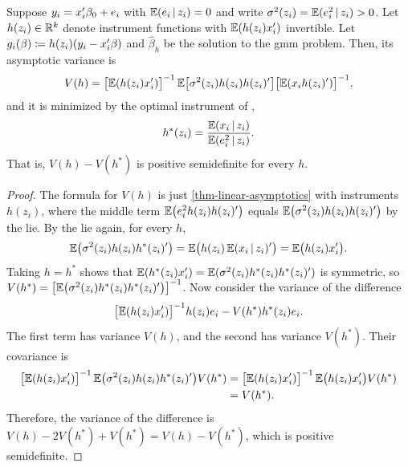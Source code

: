 \documentclass[a4paper,12pt]{article}
\begin{document}
\begin{theorem}\label{thm-optimal-instrument}
	Suppose $y_i=x_i^{\prime}\beta_0+e_i$ with $\operatorname{\mathbb{E}}(e_i\mathpunct{}|\mathpunct{} z_i)=0$ and write $\sigma^2(z_i)=\operatorname{\mathbb{E}}(e_i^2\mathpunct{}|\mathpunct{} z_i)>0$.
	Let $h(z_i)\in\mathbb{R}^k$ denote instrument functions with $\operatorname{\mathbb{E}}(h(z_i)x_i^{\prime})$ invertible.
	Let $g_i(\beta)\coloneqq h(z_i)(y_i-x_i^{\prime}\beta)$ and $\widehat\beta_h$ be the solution to the \gls{gmm} problem.
	Then, its asymptotic variance is
	\begin{align}
		V(h)=\bigl[\operatorname{\mathbb{E}}(h(z_i)x_i^{\prime})\bigr]^{-1}\operatorname{\mathbb{E}}\bigl[\sigma^2(z_i)h(z_i)h(z_i)^{\prime}\bigr]\bigl[\operatorname{\mathbb{E}}(x_ih(z_i)^{\prime})\bigr]^{-1},
	\end{align}
	and it is minimized by the optimal instrument of \textcite{chamberlain-1987},
	\begin{align}
		h^*(z_i)=\frac{\operatorname{\mathbb{E}}(x_i\mathpunct{}|\mathpunct{} z_i)}{\operatorname{\mathbb{E}}(e_i^2\mathpunct{}|\mathpunct{} z_i)}.
	\end{align}
	That is, $V(h)-V(h^*)$ is positive semidefinite for every $h$.
\end{theorem}
\begin{proof}
	The formula for $V(h)$ is just \autoref{thm-linear-asymptotics} with instruments $h(z_i)$,
	where the middle term $\operatorname{\mathbb{E}}\bigl(e_i^2h(z_i)h(z_i)^{\prime}\bigr)$ equals $\operatorname{\mathbb{E}}\bigl(\sigma^2(z_i)h(z_i)h(z_i)^{\prime}\bigr)$ by the \gls{lie}.
	By the \gls{lie} again, for every $h$,
	\begin{align*}
		\operatorname{\mathbb{E}}\bigl(\sigma^2(z_i)h(z_i)h^*(z_i)^{\prime}\bigr)
		=\operatorname{\mathbb{E}}\bigl(h(z_i)\operatorname{\mathbb{E}}(x_i\mathpunct{}|\mathpunct{} z_i)^{\prime}\bigr)
		=\operatorname{\mathbb{E}}\bigl(h(z_i)x_i^{\prime}\bigr).
	\end{align*}
	Taking $h=h^*$ shows that $\operatorname{\mathbb{E}}(h^*(z_i)x_i^{\prime})=\operatorname{\mathbb{E}}(\sigma^2(z_i)h^*(z_i)h^*(z_i)^{\prime})$ is symmetric, so $V(h^*)=\bigl[\operatorname{\mathbb{E}}\bigl(\sigma^2(z_i)h^*(z_i)h^*(z_i)^{\prime}\bigr)\bigr]^{-1}$.
	Now consider the variance of the difference
	\begin{align*}
		\bigl[\operatorname{\mathbb{E}}(h(z_i)x_i^{\prime})\bigr]^{-1} h(z_i)e_i-V(h^*)h^*(z_i)e_i.
	\end{align*}
	The first term has variance $V(h)$, and the second has variance $V(h^*)$.
	Their covariance is
	\begin{align*}
		\bigl[\operatorname{\mathbb{E}}(h(z_i)x_i^{\prime})\bigr]^{-1}\operatorname{\mathbb{E}}\bigl(\sigma^2(z_i)h(z_i)h^*(z_i)^{\prime}\bigr)V(h^*)
		&=\bigl[\operatorname{\mathbb{E}}(h(z_i)x_i^{\prime})\bigr]^{-1}\operatorname{\mathbb{E}}\bigl(h(z_i)x_i^{\prime}\bigr)V(h^*) \\
		&=V(h^*).
	\end{align*}
	Therefore, the variance of the difference is $V(h)-2V(h^*)+V(h^*)=V(h)-V(h^*)$, which is positive semidefinite.
\end{proof}
\end{document}
